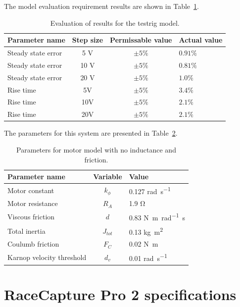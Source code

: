 The model evaluation requirement results are shown in Table~\ref{table:evaluationreqs}.
\begin{table}[H]
\caption{Evaluation of results for the testrig model.}
\label{table:evaluationreqs}
\begin{center}
\begin{tabular}{lccl}
\textbf{Parameter name} & \textbf{Step size} & \textbf{Permissable value} & \textbf{Actual value}\\
\toprule
Steady state error & 5 V & $\pm5\si{\percent}$ & $0.91\si{\percent}$\\
Steady state error & 10 V & $\pm5\si{\percent}$ & $0.81\si{\percent}$\\
Steady state error & 20 V & $\pm5\si{\percent}$ & $1.0\si{\percent}$\\
Rise time & 5V & $\pm5\si{\percent}$ & $3.4\si{\percent}$ \\
Rise time & 10V & $\pm5\si{\percent}$ & $2.1\si{\percent}$ \\
Rise time & 20V & $\pm5\si{\percent}$ & $2.1\si{\percent}$ \\
\bottomrule
\end{tabular}
\end{center}
\end{table}



The parameters for this system are presented in Table~\ref{table:model2table}.
\begin{table}[H]
\caption{Parameters for motor model with no inductance and friction.}
\label{table:model2table}
\begin{center}
\begin{tabular}{lcl}
\textbf{Parameter name} & \textbf{Variable} & \textbf{Value}\\
\toprule
Motor constant & $k_{\phi}$ & 0.127 \si{\radian\per\second} \\
Motor resistance & $R_A$ & 1.9 \si{\ohm} \\
Viscous friction & $d$ & 0.83 \si{\newton\meter\per\radian\second} \\
Total inertia & $J_{tot}$ & 0.13 \si{\kilogram\meter^{2}} \\
Coulumb friction & $F_C$ & 0.02 \si{\newton\meter} \\
Karnop velocity threshold & $d_v$ & 0.01 \si{\radian\per\second} \\
\bottomrule
\end{tabular}
\end{center}
\end{table}











\chapter{RaceCapture Pro 2 specifications}\label{app:RCP}

